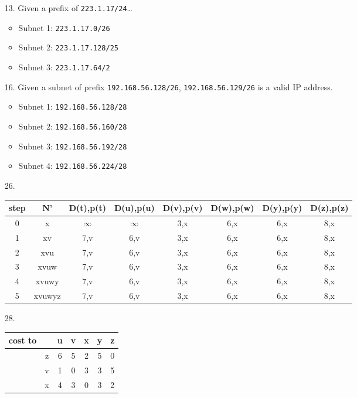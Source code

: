 \documentclass[11pt]{article}
\begin{document}
\begin{itemize}
  \item[13.] Given a prefix of \texttt{223.1.17/24}\ldots
    \begin{itemize}
      \item Subnet 1: \texttt{223.1.17.0/26}
      \item Subnet 2: \texttt{223.1.17.128/25}
      \item Subnet 3: \texttt{223.1.17.64/2}
    \end{itemize}

  \item[16.] Given a subnet of prefix \texttt{192.168.56.128/26},
    \texttt{192.168.56.129/26} is a valid IP address.
    \begin{itemize}
      \item Subnet 1: \texttt{192.168.56.128/28}
      \item Subnet 2: \texttt{192.168.56.160/28}
      \item Subnet 3: \texttt{192.168.56.192/28}
      \item Subnet 4: \texttt{192.168.56.224/28}
    \end{itemize}

  \item[26.]
    \begin{tabular}{c c c c c c c c}
      \hline
      step & N'     & D(t),p(t) & D(u),p(u) & D(v),p(v) & D(w),p(w) & D(y),p(y) & D(z),p(z) \\ \hline
      0    & x      & $\infty$  & $\infty$  & 3,x       & 6,x       & 6,x       & 8,x       \\
      1    & xv     & 7,v       & 6,v       & 3,x       & 6,x       & 6,x       & 8,x       \\
      2    & xvu    & 7,v       & 6,v       & 3,x       & 6,x       & 6,x       & 8,x       \\
      3    & xvuw   & 7,v       & 6,v       & 3,x       & 6,x       & 6,x       & 8,x       \\
      4    & xvuwy  & 7,v       & 6,v       & 3,x       & 6,x       & 6,x       & 8,x       \\
      5    & xvuwyz & 7,v       & 6,v       & 3,x       & 6,x       & 6,x       & 8,x       \\
      \hline
    \end{tabular}

  \item[28.]
    \begin{tabular}{c c | c c c c c}
      \hline
      cost to &   & u & v & x & y & z \\ \hline
              & z & 6 & 5 & 2 & 5 & 0 \\
              & v & 1 & 0 & 3 & 3 & 5 \\
              & x & 4 & 3 & 0 & 3 & 2 \\
    \end{tabular}

\end{itemize}
\end{document}
